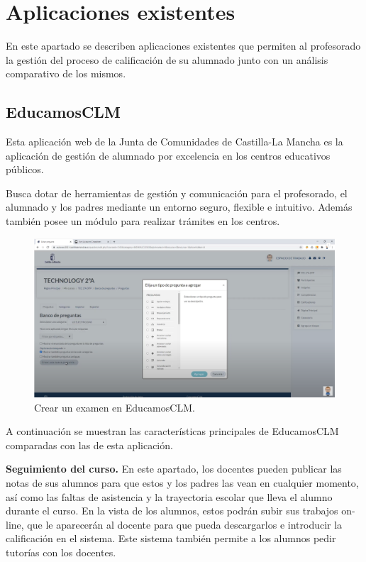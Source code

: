 \chapter{Aplicaciones existentes}
\label{cap:aplicacionesexistentes}

En este apartado se describen aplicaciones existentes que permiten al profesorado la gestión del proceso de calificación de su alumnado junto con un análisis comparativo de los mismos.

\section{EducamosCLM}

Esta aplicación web de la Junta de Comunidades de Castilla-La Mancha\cite{educamosclm} es la aplicación de gestión de alumnado por excelencia en los centros educativos públicos. 

Busca dotar de herramientas de gestión y comunicación para el profesorado, el alumnado y los padres mediante un entorno seguro, flexible e intuitivo. Además también posee un módulo para realizar trámites en los centros.

\begin{figure}[h]
\centering\includegraphics[width=1\linewidth]{figs/educamosCLM2.png}
\caption{Crear un examen en EducamosCLM.\cite{educamosclmyoutube}}
\label{Fig:educamosCLM}
\end{figure}

A continuación se muestran las características principales de EducamosCLM comparadas con las de esta aplicación.

\textbf {Seguimiento del curso.}
    En este apartado, los docentes pueden publicar las notas de sus alumnos para que estos y los padres las vean en cualquier momento, así como las faltas de asistencia y la trayectoria escolar que lleva el alumno durante el curso.
    En la vista de los alumnos, estos podrán subir sus trabajos on-line, que le aparecerán al docente para que pueda descargarlos e introducir la calificación en el sistema. Este sistema también permite a los alumnos pedir tutorías con los docentes.


